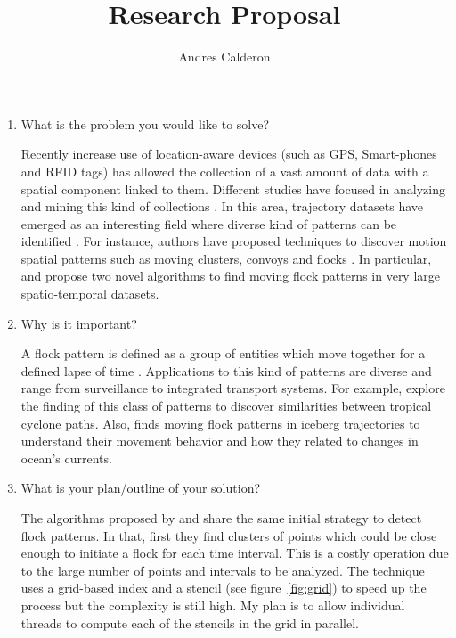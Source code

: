 \documentclass[a4paper, 12pt]{scrartcl}
\title{Research Proposal}
\author{Andres Calderon}
\begin{document}
\maketitle

\begin{enumerate}
 \item What is the problem you would like to solve?
 
Recently increase use of location-aware devices (such as GPS, Smart-phones and RFID tags) has allowed the collection of a vast amount of data with a spatial component linked to them.  Different studies have focused in analyzing and mining this kind of collections \citep{leung_knowledge_2010}\citep{Miller_2001}.  In this area, trajectory datasets have emerged as an interesting field where diverse kind of patterns can be identified \citep{zheng_computing_2011}\citep{vieira_spatio-temporal_2013}.  For instance, authors have proposed techniques to discover motion spatial patterns such as moving clusters\citep{kalnis_discovering_2005}, convoys\citep{jeung_discovery_2008} and flocks \citep{benkert_reporting_2006}\citep{gudmundsson_computing_2006}.  In particular, \citep{vieira_-line_2009} and \citep{turdukulov_visual_2014} propose two novel algorithms to find moving flock patterns in very large spatio-temporal datasets.  
 
 \item Why is it important?
 
A flock pattern is defined as a group of entities which move together for a defined lapse of time \citep{benkert_reporting_2006}.  Applications to this kind of patterns are diverse and range from surveillance to integrated transport systems.  For example, \citep{turdukulov_visual_2014} explore the finding of this class of patterns to discover similarities between tropical cyclone paths. Also, \citep{calderon_mining_2011} finds moving flock patterns in iceberg trajectories to understand their movement behavior and how they related to changes in ocean's currents. 
 
 \item What is your plan/outline of your solution?
 
The algorithms proposed by \citep{vieira_-line_2009} and \citep{turdukulov_visual_2014} share the same initial strategy to detect flock patterns.  In that, first they find clusters of points which could be close enough to initiate a flock for each time interval.  This is a costly operation due to the large number of points and intervals to be analyzed.  The technique uses a grid-based index and a stencil (see figure~\ref{fig:grid}) to speed up the process but the complexity is still high.  My plan is to allow  individual threads to compute each of the stencils in the grid in parallel.


\end{enumerate}
\end{document}
